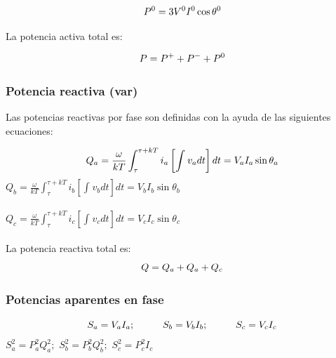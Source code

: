 \begin{equation}\label{EQ46}
P^0=3V^{0}I^{0}\cos\theta^{0}\\
\end{equation} 

La potencia activa total es:

\begin{equation}\label{EQ47}
P=P^{+}+P^{-}+P^{0}\\
\end{equation}

\subsubsection{Potencia reactiva (var)}

Las potencias reactivas por fase son definidas con la ayuda de las siguientes ecuaciones:

\begin{equation}\label{EQ48}
Q_{a}=\frac{\omega}{kT}\int_{\tau}^{\tau +kT}i_{a}\left[\int_{}^{}v_{a}dt\right]dt=V_{a}I_{a}\sin\theta_{a}\\
\end{equation}
$Q_{b}=\frac{\omega}{kT}\int_{\tau}^{\tau +kT}i_{b}\left[\int_{}^{}v_{b}dt\right]dt=V_{b}I_{b}\sin\theta_{b}$\\\\

$Q_{c}=\frac{\omega}{kT}\int_{\tau}^{\tau +kT}i_{c}\left[\int_{}^{}v_{c}dt\right]dt=V_{c}I_{c}\sin\theta_{c}$\\\\

La potencia reactiva total es:\\

\begin{equation}\label{EQ50}
Q=Q_{a}+Q_{a}+Q_{c}\\
\end{equation}

\subsubsection{Potencias aparentes en fase}

\begin{equation}\label{EQ51}
S_{a}=V_{a}I_{a}; \hspace{1cm} S_{b}=V_{b}I_{b}; \hspace{1cm} S_{c}=V_{c}I_{c}\\
\end{equation}
$S^2_{a}=P^2_{a}Q^2_{a};$ \hspace{1cm} $S^2_{b}=P^2_{b}Q^2_{b};$ \hspace{1cm} $S^2_{c}=P^2_{c}I_{c}$\\

